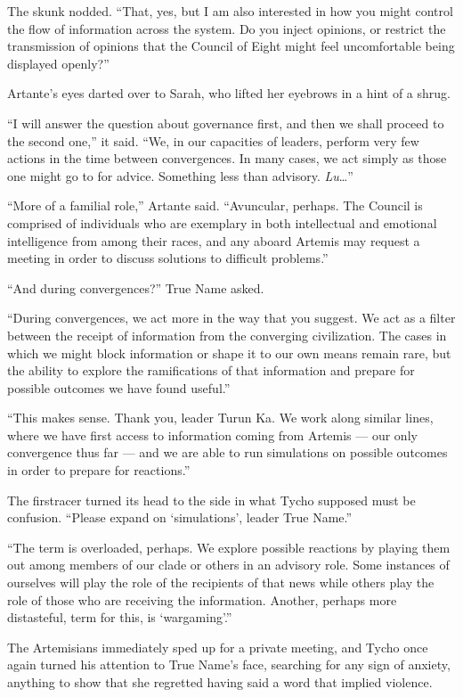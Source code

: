The skunk nodded. ``That, yes, but I am also interested in how you might control the flow of information across the system. Do you inject opinions, or restrict the transmission of opinions that the Council of Eight might feel uncomfortable being displayed openly?''

Artante's eyes darted over to Sarah, who lifted her eyebrows in a hint of a shrug.

``I will answer the question about governance first, and then we shall proceed to the second one,'' it said. ``We, in our capacities of leaders, perform very few actions in the time between convergences. In many cases, we act simply as those one might go to for advice. Something less than advisory. \emph{Lu}\ldots{}''

``More of a familial role,'' Artante said. ``Avuncular, perhaps. The Council is comprised of individuals who are exemplary in both intellectual and emotional intelligence from among their races, and any aboard Artemis may request a meeting in order to discuss solutions to difficult problems.''

``And during convergences?'' True Name asked.

``During convergences, we act more in the way that you suggest. We act as a filter between the receipt of information from the converging civilization. The cases in which we might block information or shape it to our own means remain rare, but the ability to explore the ramifications of that information and prepare for possible outcomes we have found useful.''

``This makes sense. Thank you, leader Turun Ka. We work along similar lines, where we have first access to information coming from Artemis — our only convergence thus far — and we are able to run simulations on possible outcomes in order to prepare for reactions.''

The firstracer turned its head to the side in what Tycho supposed must be confusion. ``Please expand on `simulations', leader True Name.''

``The term is overloaded, perhaps. We explore possible reactions by playing them out among members of our clade or others in an advisory role. Some instances of ourselves will play the role of the recipients of that news while others play the role of those who are receiving the information. Another, perhaps more distasteful, term for this, is `wargaming'.''

The Artemisians immediately sped up for a private meeting, and Tycho once again turned his attention to True Name's face, searching for any sign of anxiety, anything to show that she regretted having said a word that implied violence.

